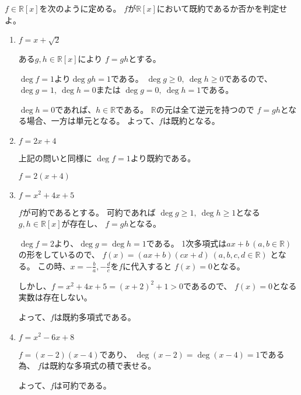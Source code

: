 \documentclass[12pt,b5paper]{ltjsarticle}
\begin{document}
$f\in\mathbb{R}[x]$を次のように定める。
$f$が$\mathbb{R}[x]$において既約であるか否かを判定せよ。
\begin{enumerate}
 \item $f=x+\sqrt{2}$

       \dotfill

       ある$g,h\in\mathbb{R}[x]$により
       $f=gh$とする。

       $\deg{f}=1$より$\deg{gh}=1$である。
       $\deg{g}\geq 0, \ \deg{h}\geq 0$であるので、
       $\deg{g}= 1, \ \deg{h}= 0$または
       $\deg{g}= 0, \ \deg{h}= 1$である。

       $\deg{h}=0$であれば、$h\in\mathbb{R}$である。
       $\mathbb{R}$の元は全て逆元を持つので
       $f=gh$となる場合、一方は単元となる。
       よって、$f$は既約となる。

       \hrulefill

 \item $f=2x+4$

       \dotfill

       上記の問いと同様に
       $\deg{f}=1$より既約である。

       $f=2(x+4)$

       \hrulefill

 \item $f=x^2+4x+5$

       \dotfill

       $f$が可約であるとする。
       可約であれば
       $\deg{g}\geq1,\ \deg{h}\geq1$となる
       $g, h\in\mathbb{R}[x]$が存在し、
       $f=gh$となる。

       $\deg{f}=2$より、$\deg{g}=\deg{h}=1$である。
       1次多項式は$ax+b\ (a,b\in\mathbb{R})$
       の形をしているので、
       $f(x)=(ax+b)(cx+d) \ (a,b,c,d\in\mathbb{R})$
       となる。
       この時、$x=-\frac{b}{a},-\frac{d}{c}$を$f$に代入すると
       $f(x)=0$となる。

       しかし、$f=x^2+4x+5=(x+2)^2+1>0$であるので、
       $f(x)=0$となる実数は存在しない。

       よって、$f$は既約多項式である。

       \hrulefill

 \item $f=x^2-6x+8$

       \dotfill

       $f=(x - 2)(x - 4)$であり、
       $\deg{(x - 2)}=\deg{(x - 4)}=1$である為、
       $f$は既約な多項式の積で表せる。

       よって、$f$は可約である。


\end{enumerate}
\end{document}
